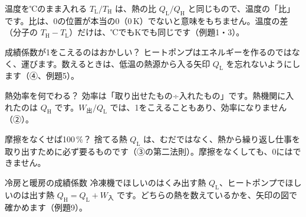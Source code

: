\begin{tsumazuki}{温度を℃のまま入れる}
$T_{\mathrm L}/T_{\mathrm H}$ は、熱の比 $Q_{\mathrm L}/Q_{\mathrm H}$ と同じもので、温度の「比」です。比は、0の位置が本当の0（0\,K）でないと意味をもちません。温度の差（分子の $T_{\mathrm H}-T_{\mathrm L}$）だけは、℃でもKでも同じです（例題1・3）。
\end{tsumazuki}

\begin{tsumazuki}{成績係数が1をこえるのはおかしい？}
ヒートポンプはエネルギーを作るのではなく、運びます。数えるときは、低温の熱源から入る矢印 $Q_{\mathrm L}$ を忘れないようにします（④、例題5）。
\end{tsumazuki}

\begin{tsumazuki}{熱効率を何でわる？}
効率は「取り出せたもの÷入れたもの」です。熱機関に入れたのは $Q_{\mathrm H}$ です。$W_{\text{出}}/Q_{\mathrm L}$ では、1をこえることもあり、効率になりません（②）。
\end{tsumazuki}

\begin{tsumazuki}{摩擦をなくせば100\,\%？}
捨てる熱 $Q_{\mathrm L}$ は、むだではなく、熱から繰り返し仕事を取り出すために必ず要るものです（③の第二法則）。摩擦をなくしても、0にはできません。
\end{tsumazuki}

\begin{tsumazuki}{冷房と暖房の成績係数}
冷凍機でほしいのはくみ出す熱 $Q_{\mathrm L}$、ヒートポンプでほしいのは出す熱 $Q_{\mathrm H}=Q_{\mathrm L}+W_{\text{入}}$ です。どちらの熱を数えているかを、矢印の図で確かめます（例題9）。
\end{tsumazuki}

